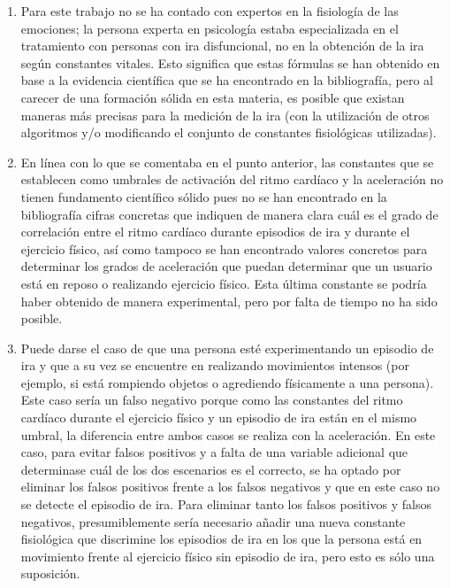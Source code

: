 \begin{enumerate}
    \item Para este trabajo no se ha contado con expertos en la fisiología de las emociones; la persona experta en psicología estaba especializada en el tratamiento con personas con ira disfuncional, no en la obtención de la ira según constantes vitales. Esto significa que estas fórmulas se han obtenido en base a la evidencia científica que se ha encontrado en la bibliografía, pero al carecer de una formación sólida en esta materia, es posible que existan maneras más precisas para la medición de la ira (con la utilización de otros algoritmos y/o modificando el conjunto de constantes fisiológicas utilizadas).
    \item En línea con lo que se comentaba en el punto anterior, las constantes que se establecen como umbrales de activación del ritmo cardíaco y la aceleración no tienen fundamento científico sólido pues no se han encontrado en la bibliografía cifras concretas que indiquen de manera clara cuál es el grado de correlación entre el ritmo cardíaco durante episodios de ira y durante el ejercicio físico, así como tampoco se han encontrado valores concretos para determinar los grados de aceleración que puedan determinar que un usuario está en reposo o realizando ejercicio físico. Esta última constante se podría haber obtenido de manera experimental, pero por falta de tiempo no ha sido posible.
    \item Puede darse el caso de que una persona esté experimentando un episodio de ira y que a su vez se encuentre en realizando movimientos intensos (por ejemplo, si está rompiendo objetos o agrediendo físicamente a una persona). Este caso sería un falso negativo porque como las constantes del ritmo cardíaco durante el ejercicio físico y un episodio de ira están en el mismo umbral, la diferencia entre ambos casos se realiza con la aceleración. En este caso, para evitar falsos positivos y a falta de una variable adicional que determinase cuál de los dos escenarios es el correcto, se ha optado por eliminar los falsos positivos frente a los falsos negativos y que en este caso no se detecte el episodio de ira. Para eliminar tanto los falsos positivos y falsos negativos, presumiblemente sería necesario añadir una nueva constante fisiológica que discrimine los episodios de ira en los que la persona está en movimiento frente al ejercicio físico sin episodio de ira, pero esto es sólo una suposición.
\end{enumerate}